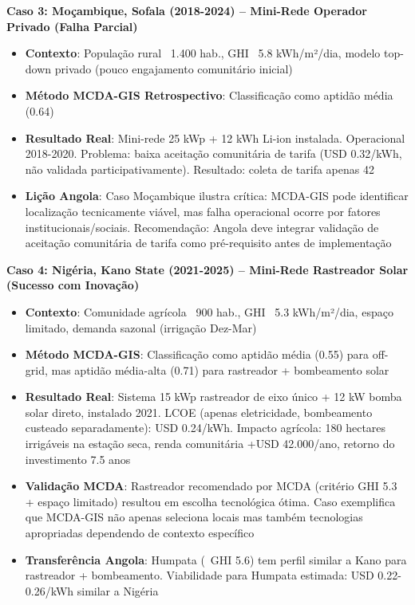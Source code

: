 \documentclass[12pt, a4paper]{article}
\begin{document}
\textbf{Caso 3: Moçambique, Sofala (2018-2024) – Mini-Rede Operador Privado (Falha Parcial)}
\begin{itemize}
\item \textbf{Contexto}: População rural ~1.400 hab., GHI ~5.8 kWh/m²/dia, modelo top-down privado (pouco engajamento comunitário inicial)
\item \textbf{Método MCDA-GIS Retrospectivo}: Classificação como aptidão média (0.64)
\item \textbf{Resultado Real}: Mini-rede 25 kWp + 12 kWh Li-ion instalada. Operacional 2018-2020. Problema: baixa aceitação comunitária de tarifa (USD 0.32/kWh, não validada participativamente). Resultado: coleta de tarifa apenas 42%
\item \textbf{Lição Angola}: Caso Moçambique ilustra crítica: MCDA-GIS pode identificar localização tecnicamente viável, mas falha operacional ocorre por fatores institucionais/sociais. Recomendação: Angola deve integrar validação de aceitação comunitária de tarifa como pré-requisito antes de implementação
\end{itemize}

\textbf{Caso 4: Nigéria, Kano State (2021-2025) – Mini-Rede Rastreador Solar (Sucesso com Inovação)}
\begin{itemize}
\item \textbf{Contexto}: Comunidade agrícola ~900 hab., GHI ~5.3 kWh/m²/dia, espaço limitado, demanda sazonal (irrigação Dez-Mar)
\item \textbf{Método MCDA-GIS}: Classificação como aptidão média (0.55) para off-grid, mas aptidão média-alta (0.71) para rastreador + bombeamento solar
\item \textbf{Resultado Real}: Sistema 15 kWp rastreador de eixo único + 12 kW bomba solar direto, instalado 2021. LCOE (apenas eletricidade, bombeamento custeado separadamente): USD 0.24/kWh. Impacto agrícola: 180 hectares irrigáveis na estação seca, renda comunitária +USD 42.000/ano, retorno do investimento 7.5 anos
\item \textbf{Validação MCDA}: Rastreador recomendado por MCDA (critério GHI 5.3 + espaço limitado) resultou em escolha tecnológica ótima. Caso exemplifica que MCDA-GIS não apenas seleciona locais mas também tecnologias apropriadas dependendo de contexto específico
\item \textbf{Transferência Angola}: Humpata (~GHI 5.6) tem perfil similar a Kano para rastreador + bombeamento. Viabilidade para Humpata estimada: USD 0.22-0.26/kWh similar a Nigéria
\end{itemize}
\end{document}
